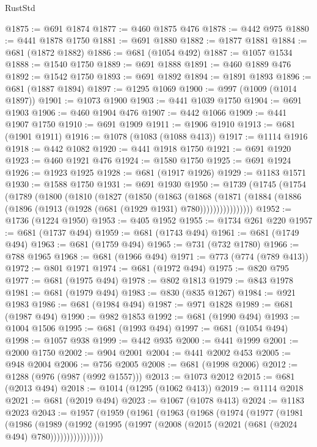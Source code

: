 \begin{lexlean}{RustStd}
\begin{coremodule}
@1875 := @691 @1874
@1877 := @460 @1875 @476
@1878 := @442 @975
@1880 := @441 @1878 @1750
@1881 := @691 @1880
@1882 := @1877 @1881
@1884 := @681 (@1872 @1882)
@1886 := @681 (@1054 @492)
@1887 := @1057 @1534
@1888 := @1540 @1750
@1889 := @691 @1888
@1891 := @460 @1889 @476
@1892 := @1542 @1750
@1893 := @691 @1892
@1894 := @1891 @1893
@1896 := @681 (@1887 @1894)
@1897 := @1295 @1069
@1900 := @997 (@1009 (@1014 @1897))
@1901 := @1073 @1900
@1903 := @441 @1039 @1750
@1904 := @691 @1903
@1906 := @460 @1904 @476
@1907 := @442 @1066
@1909 := @441 @1907 @1750
@1910 := @691 @1909
@1911 := @1906 @1910
@1913 := @681 (@1901 @1911)
@1916 := @1078 (@1083 (@1088 @413))
@1917 := @1114 @1916
@1918 := @442 @1082
@1920 := @441 @1918 @1750
@1921 := @691 @1920
@1923 := @460 @1921 @476
@1924 := @1580 @1750
@1925 := @691 @1924
@1926 := @1923 @1925
@1928 := @681 (@1917 @1926)
@1929 := @1183 @1571
@1930 := @1588 @1750
@1931 := @691 @1930
@1950 := @1739
    (@1745
      (@1754
        (@1789
          (@1800
            (@1810
              (@1827
                (@1850
                  (@1863
                    (@1868
                      (@1871
                        (@1884 (@1886 (@1896 (@1913 (@1928 (@681 (@1929 @1931) @780))))))))))))))))
@1952 := @1736 (@1224 @1950)
@1953 := @405 @1952
@1955 := @1734 @261 @220
@1957 := @681 (@1737 @494)
@1959 := @681 (@1743 @494)
@1961 := @681 (@1749 @494)
@1963 := @681 (@1759 @494)
@1965 := @731 (@732 @1780)
@1966 := @788 @1965
@1968 := @681 (@1966 @494)
@1971 := @773 (@774 (@789 @413))
@1972 := @801 @1971
@1974 := @681 (@1972 @494)
@1975 := @820 @795
@1977 := @681 (@1975 @494)
@1978 := @802 @1813
@1979 := @843 @1978
@1981 := @681 (@1979 @494)
@1983 := @830 (@835 @1267)
@1984 := @921 @1983
@1986 := @681 (@1984 @494)
@1987 := @971 @1828
@1989 := @681 (@1987 @494)
@1990 := @982 @1853
@1992 := @681 (@1990 @494)
@1993 := @1004 @1506
@1995 := @681 (@1993 @494)
@1997 := @681 (@1054 @494)
@1998 := @1057 @938
@1999 := @442 @935
@2000 := @441 @1999
@2001 := @2000 @1750
@2002 := @904 @2001
@2004 := @441 @2002 @453
@2005 := @948 @2004
@2006 := @756 @2005
@2008 := @681 (@1998 @2006)
@2012 := @1288 (@976 (@987 (@992 @1557)))
@2013 := @1073 @2012
@2015 := @681 (@2013 @494)
@2018 := @1014 (@1295 (@1062 @413))
@2019 := @1114 @2018
@2021 := @681 (@2019 @494)
@2023 := @1067 (@1078 @413)
@2024 := @1183 @2023
@2043 := @1957
    (@1959
      (@1961
        (@1963
          (@1968
            (@1974
              (@1977
                (@1981
                  (@1986
                    (@1989
                      (@1992
                        (@1995 (@1997 (@2008 (@2015 (@2021 (@681 (@2024 @494) @780))))))))))))))))

\end{coremodule}
\end{lexlean}
